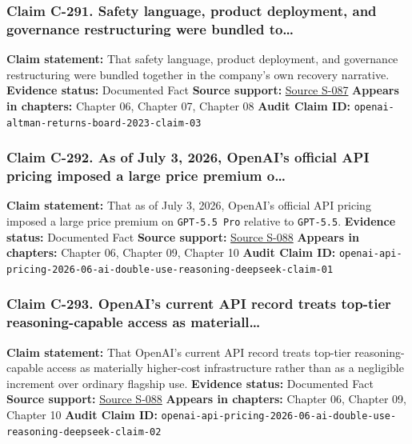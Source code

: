 \documentclass[
  american,
  11pt,
  letterpaper,
]{article}
\begin{document}
\subsubsection{Claim C-291. Safety language, product deployment, and
governance restructuring were bundled
to\ldots{}}\label{claim-c-291-safety-language-product-deployment-and-governance-restructuring-were-bundled-to}

\textbf{Claim statement:} That safety language, product deployment, and
governance restructuring were bundled together in the company's own
recovery narrative. \textbf{Evidence status:} Documented Fact
\textbf{Source support:}
\hyperref[source-s-087-sam-altman-returns-as-ceo-openai-has-a-new-initial-board]{Source
S-087} \textbf{Appears in chapters:} Chapter 06, Chapter 07, Chapter 08
\textbf{Audit Claim ID:}
\texttt{openai-altman-returns-board-2023-claim-03}

\subsubsection{Claim C-292. As of July 3, 2026, OpenAI's official API
pricing imposed a large price premium
o\ldots{}}\label{claim-c-292-as-of-july-3-2026-openai-s-official-api-pricing-imposed-a-large-price-premium-o}

\textbf{Claim statement:} That as of July 3, 2026, OpenAI's official API
pricing imposed a large price premium on \texttt{GPT-5.5\ Pro} relative
to \texttt{GPT-5.5}. \textbf{Evidence status:} Documented Fact
\textbf{Source support:}
\hyperref[source-s-088-pricing-openai-api]{Source S-088} \textbf{Appears
in chapters:} Chapter 06, Chapter 09, Chapter 10 \textbf{Audit Claim
ID:}
\texttt{openai-api-pricing-2026-06-ai-double-use-reasoning-deepseek-claim-01}

\subsubsection{Claim C-293. OpenAI's current API record treats top-tier
reasoning-capable access as
materiall\ldots{}}\label{claim-c-293-openai-s-current-api-record-treats-top-tier-reasoning-capable-access-as-materiall}

\textbf{Claim statement:} That OpenAI's current API record treats
top-tier reasoning-capable access as materially higher-cost
infrastructure rather than as a negligible increment over ordinary
flagship use. \textbf{Evidence status:} Documented Fact \textbf{Source
support:} \hyperref[source-s-088-pricing-openai-api]{Source S-088}
\textbf{Appears in chapters:} Chapter 06, Chapter 09, Chapter 10
\textbf{Audit Claim ID:}
\texttt{openai-api-pricing-2026-06-ai-double-use-reasoning-deepseek-claim-02}
\end{document}
